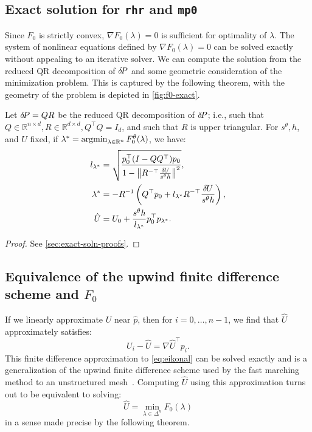 \documentclass[sisc-eikonal.tex]{subfiles}
\begin{document}
\subsection{Exact solution for \texttt{rhr} and \texttt{mp0}}\label{ssec:exact-soln}

Since $F_0$ is strictly convex, $\nabla F_0(\lambda) = 0$ is
sufficient for optimality of $\lambda$. The system of nonlinear
equations defined by $\nabla F_0(\lambda) = 0$ can be solved exactly
without appealing to an iterative solver. We can compute the solution
from the reduced QR decomposition of ${\delta \hspace{-0.14em} P}$ and some geometric
consideration of the minimization problem. This is captured by the
following theorem, with the geometry of the problem is depicted in
\cref{fig:f0-exact}.

\begin{theorem}\label{thm:f0-exact}
  Let ${\delta \hspace{-0.14em} P} = QR$ be the reduced QR decomposition of ${\delta \hspace{-0.14em} P}$;
  i.e., such that
  $Q \in \mathbb{R}^{n \times d}, R \in \mathbb{R}^{d \times d},
  Q^\top Q = I_d$, and such that $R$ is upper triangular. For
  $s^\theta, h$, and $U$ fixed, if
  $\lambda^* = \operatorname{argmin}_{\lambda \in \mathbb{R}^n}
  F_0^\theta(\lambda)$, we have:
  \begin{align}
    l_{\lambda^*} &= \sqrt{\frac{p_0^\top {(I - QQ^\top)} p_0}{1 - \norm{R^{-\top} \frac{\delU}{s^\theta h}}^2}},\label{eq:l-star-expression} \\
    \lambda^* &= -R^{-1} \parens{Q^\top p_0 + l_{\lambda^*} R^{-\top} \frac{\delU}{s^\theta h}},\label{eq:f0-exact-lambda} \\ 
    \hat{U} &= U_0 + \frac{s^\theta h}{l_{\lambda^*}} p_0^\top p_{\lambda^*}.\label{eq:f0-exact}
  \end{align}
\end{theorem}

\begin{proof}
  See \cref{sec:exact-soln-proofs}.
\end{proof}

\subsection{Equivalence of the upwind finite difference scheme and
  $F_0$}\label{ssec:equivalence}

If we linearly approximate $U$ near $\hat{p}$, then for
$i = 0, \hdots, n - 1$, we find that $\hat{U}$ approximately
satisfies:
\begin{equation}
  \label{eq:finite-differences}
  U_i - \hat{U} = \nabla \hat{U}^\top p_i.
\end{equation}
This finite difference approximation to \cref{eq:eikonal} can be
solved exactly and is a generalization of the upwind finite difference
scheme used by the fast marching method to an unstructured
mesh~\cite{kimmel1998computing,sethian2000fast}. Computing $\hat{U}$
using this approximation turns out to be equivalent to solving:
\begin{equation}
  \hat{U} = \min_{\lambda \in \Delta^n} F_0(\lambda)
\end{equation}
in a sense made precise by the following theorem.
\end{document}
